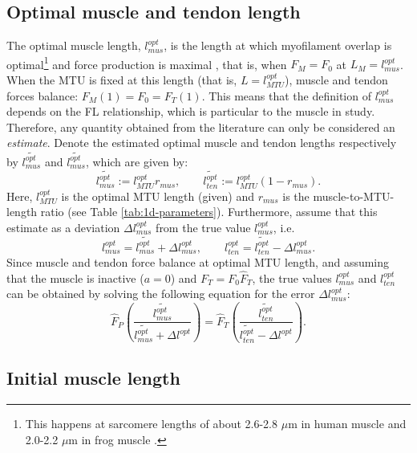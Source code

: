 \documentclass{sfuthesis}
\numberwithin{equation}{chapter}
\numberwithin{figure}{chapter}
\numberwithin{table}{chapter}
\theoremstyle{definition}
\begin{document}
\subsection{Optimal muscle and tendon length} \label{sec:optimal_muscle_length}

The optimal muscle length, $l_{mus}^{opt}$, is the length at which myofilament overlap is optimal\footnote{This happens at sarcomere lengths of about 2.6-2.8 $\mu$m in human muscle and 2.0-2.2 $\mu$m in frog muscle \cite{FridenLieber1998}.} and force production is maximal \cite{FridenLieber1998}, that is, when $F_M = F_0$ at $L_M = l_{mus}^{opt}$. When the MTU is fixed at this length (that is, $L = l_{MTU}^{opt}$), muscle and tendon forces balance:
$F_M(1) = F_0 = F_T(1)$. This means that the definition of $l_{mus}^{opt}$ depends on the FL relationship, which is particular to the muscle in study. Therefore, any quantity obtained from the literature can only be considered an \textit{estimate}. Denote the estimated optimal muscle and tendon lengths respectively by $\widetilde{l_{mus}^{opt}}$ and $\widetilde{l_{mus}^{opt}}$, which are given by:
\begin{equation}
	\widetilde{l_{mus}^{opt}} := l_{MTU}^{opt} r_{mus}, \qquad \widetilde{l_{ten}^{opt}} := l_{MTU}^{opt}(1-r_{mus}).
\end{equation}
Here, $l_{MTU}^{opt}$ is the optimal MTU length (given) and $r_{mus}$ is the muscle-to-MTU-length ratio (see Table \ref{tab:1d-parameters}). Furthermore, assume that this estimate as a deviation $\Delta l_{mus}^{opt}$ from the true value $l_{mus}^{opt}$, i.e.
\begin{equation}
    l_{mus}^{opt} = \widetilde{l_{mus}^{opt}} + \Delta l^{opt}_{mus}, \qquad l_{ten}^{opt} = \widetilde{l_{ten}^{opt}} - \Delta l^{opt}_{mus}.
\end{equation}
Since muscle and tendon force balance at optimal MTU length, and assuming that the muscle is inactive ($a=0$) and $F_T = F_0 \widehat{F}_T$, the true values $l_{mus}^{opt}$ and $l_{ten}^{opt}$ can be obtained by solving the following equation for the error $\Delta l_{mus}^{opt}$:
\begin{equation} \label{eq:calibration_1}
    \widehat{F}_P\left( \dfrac{\widetilde{l_{mus}^{opt}}}{\widetilde{l_{mus}^{opt}} + \Delta l^{opt}} \right) = \widehat{F}_T \left( \dfrac{\widetilde{l_{ten}^{opt}}}{\widetilde{l_{ten}^{opt}} - \Delta l^{opt}} \right).
\end{equation}

\subsection{Initial muscle length}
\end{document}
